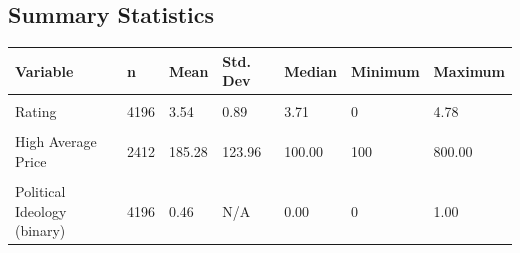 \documentclass[letterpaper, 12pt]{article}
\begin{document}
\begin{appendices}
\subsection{Summary Statistics}
\begingroup
\begin{longtable}[c]{lllllll}
\toprule
\textbf{Variable} & \textbf{n} & \textbf{Mean} & \textbf{Std. Dev} & \textbf{Median} & \textbf{Minimum} & \textbf{Maximum}\\
\midrule
\cellcolor{gray!6}{Store Status (binary)} & \cellcolor{gray!6}{4196} & \cellcolor{gray!6}{0.71} & \cellcolor{gray!6}{N/A} & \cellcolor{gray!6}{1.00} & \cellcolor{gray!6}{0} & \cellcolor{gray!6}{1.00}\\
Rating & 4196 & 3.54 & 0.89 & 3.71 & 0 & 4.78\\
\cellcolor{gray!6}{Low Average Price} & \cellcolor{gray!6}{4179} & \cellcolor{gray!6}{75.19} & \cellcolor{gray!6}{51.79} & \cellcolor{gray!6}{51.00} & \cellcolor{gray!6}{50} & \cellcolor{gray!6}{401.00}\\
High Average Price & 2412 & 185.28 & 123.96 & 100.00 & 100 & 800.00\\
\cellcolor{gray!6}{Chain Store (binary)} & \cellcolor{gray!6}{4196} & \cellcolor{gray!6}{0.34} & \cellcolor{gray!6}{N/A} & \cellcolor{gray!6}{0.00} & \cellcolor{gray!6}{0} & \cellcolor{gray!6}{1.00}\\
Political Ideology (binary) & 4196 & 0.46 & N/A & 0.00 & 0 & 1.00\\
\bottomrule
\end{longtable}
\endgroup{}





\end{appendices}
\end{document}
